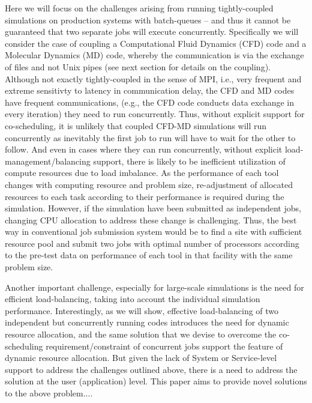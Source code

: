 \documentclass[times, 10pt,twocolumn]{article}
\begin{document}
Here we will focus on the challenges arising from running tightly-coupled simulations on production systems with batch-queues -- and thus it cannot be guaranteed that two separate jobs will execute concurrently. Specifically we will consider the case of coupling a Computational Fluid Dynamics (CFD) code and a Molecular Dynamics (MD) code, whereby the communication is via the exchange of files and not Unix pipes (see next section for details on the coupling).  Although not exactly tightly-coupled in the sense of MPI, i.e., very frequent and extreme sensitivty to latency in communication delay, the CFD and MD codes have frequent communications, (e.g., the CFD code conducts data exchange in every iteration) they need to run concurrently.  Thus, without explicit support for co-scheduling, it is unlikely that coupled CFD-MD simulations will run concurrently as inevitably the first job to run will have to wait for the other to follow.
And even in cases where they can run concurrently, without explicit load-management/balancing support, there is likely to be inefficient utilization of compute resources due to load imbalance.  As the performance of each tool changes with computing resource and problem size, re-adjustment of allocated resources to each task according to their performance is required during the simulation. However, if the simulation have been submitted as independent jobs, changing CPU allocation to address these change is challenging. Thus, the best way in conventional job submission system would be to find a site with sufficient resource pool and submit two jobs with optimal number of processors according to the pre-test data on performance of each tool in that facility with the same problem size.

Another important challenge, especially for large-scale simulations is the need for efficient load-balancing, taking into account the individual simulation performance.  Interestingly, as we will show, effective load-balancing of two independent but concurrently running codes introduces the need for dynamic resource allocation, and the same solution that we devise to overcome the co-scheduling requirement/constraint of concurrent jobs support the feature of dynamic resource allocation.  But given the lack of System or Service-level support to address the challenges outlined above, there is a need to address the solution at the user (application) level. This paper aims to provide novel solutions to the above problem....
\end{document}
